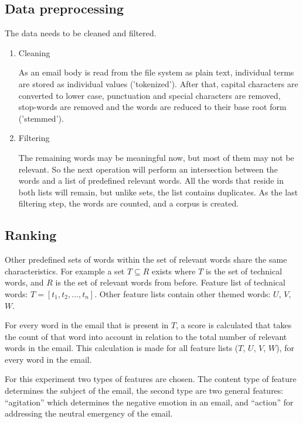 \documentclass[journal]{IEEEtran}
\begin{document}
\subsection{Data preprocessing}
The data needs to be cleaned and filtered.

\begin{enumerate}
    \item Cleaning

    As an email body is read from the file system as plain text, individual terms are stored as individual values ('tokenized'). After that, capital characters are converted to lower case, punctuation and special characters are removed, stop-words are removed and the words are reduced to their base root form ('stemmed').

    \item Filtering

    The remaining words may be meaningful now, but most of them may not be
    relevant. So the next operation will perform an intersection between the
    words and a list of predefined relevant words. All the words that reside
    in both lists will remain, but unlike sets, the list contains duplicates.
    As the last filtering step, the words are counted, and a corpus is created.

\end{enumerate}

\subsection{Ranking}

Other predefined sets of words within the set of relevant words share the
    same characteristics. For example a set $T \subseteq R$ exists where $T$
    is the set of technical words, and $R$ is the set of relevant words from
    before. Feature list of technical words: $T = [t_1, t_2, \dots, t_n]$.
    Other feature lists contain other themed words: $U$, $V$, $W$.

    For every word in the email that is present in $T$, a score is calculated
    that takes the count of that word into account in relation to the total
    number of relevant words in the email. This calculation is made for all
    feature lists ($T$, $U$, $V$, $W$), for every word in the email.

	For this experiment two types of features are chosen.
	The content type of feature determines the subject of the email, the second type are two general features: ``agitation'' which determines the negative emotion in an email, and ``action'' for addressing the neutral emergency of the email.
\end{document}
